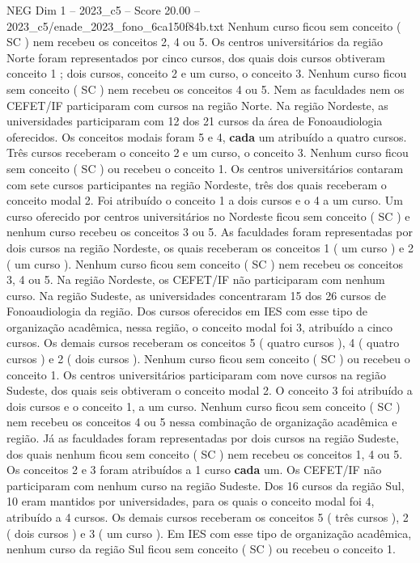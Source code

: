 \begin{textsample}{NEG Dim 1 – 2023\_c5 – Score 20.00 – 2023\_c5/enade\_2023\_fono\_6ca150f84b.txt}
Nenhum curso ficou sem conceito ( SC ) nem recebeu os conceitos 2, 4 ou 5.
Os centros universitários da região Norte foram representados por cinco cursos, dos quais dois cursos obtiveram conceito 1 ; dois cursos, conceito 2 e um curso, o conceito 3.
Nenhum curso ficou sem conceito ( SC ) nem recebeu os conceitos 4 ou 5.
Nem as faculdades nem os CEFET/IF participaram com cursos na região Norte.
Na região Nordeste, as universidades participaram com 12 dos 21 cursos da área de Fonoaudiologia oferecidos.
Os conceitos modais foram 5 e 4, \textbf{cada} um atribuído a quatro cursos.
Três cursos receberam o conceito 2 e um curso, o conceito 3.
Nenhum curso ficou sem conceito ( SC ) ou recebeu o conceito 1.
Os centros universitários contaram com sete cursos participantes na região Nordeste, três dos quais receberam o conceito modal 2.
Foi atribuído o conceito 1 a dois cursos e o 4 a um curso.
Um curso oferecido por centros universitários no Nordeste ficou sem conceito ( SC ) e nenhum curso recebeu os conceitos 3 ou 5.
As faculdades foram representadas por dois cursos na região Nordeste, os quais receberam os conceitos 1 ( um curso ) e 2 ( um curso ).
Nenhum curso ficou sem conceito ( SC ) nem recebeu os conceitos 3, 4 ou 5.
Na região Nordeste, os CEFET/IF não participaram com nenhum curso.
Na região Sudeste, as universidades concentraram 15 dos 26 cursos de Fonoaudiologia da região.
Dos cursos oferecidos em IES com esse tipo de organização acadêmica, nessa região, o conceito modal foi 3, atribuído a cinco cursos.
Os demais cursos receberam os conceitos 5 ( quatro cursos ), 4 ( quatro cursos ) e 2 ( dois cursos ).
Nenhum curso ficou sem conceito ( SC ) ou recebeu o conceito 1.
Os centros universitários participaram com nove cursos na região Sudeste, dos quais seis obtiveram o conceito modal 2.
O conceito 3 foi atribuído a dois cursos e o conceito 1, a um curso.
Nenhum curso ficou sem conceito ( SC ) nem recebeu os conceitos 4 ou 5 nessa combinação de organização acadêmica e região.
Já as faculdades foram representadas por dois cursos na região Sudeste, dos quais nenhum ficou sem conceito ( SC ) nem recebeu os conceitos 1, 4 ou 5.
Os conceitos 2 e 3 foram atribuídos a 1 curso \textbf{cada} um.
Os CEFET/IF não participaram com nenhum curso na região Sudeste.
Dos 16 cursos da região Sul, 10 eram mantidos por universidades, para os quais o conceito modal foi 4, atribuído a 4 cursos.
Os demais cursos receberam os conceitos 5 ( três cursos ), 2 ( dois cursos ) e 3 ( um curso ).
Em IES com esse tipo de organização acadêmica, nenhum curso da região Sul ficou sem conceito ( SC ) ou recebeu o conceito 1.

\end{textsample}

